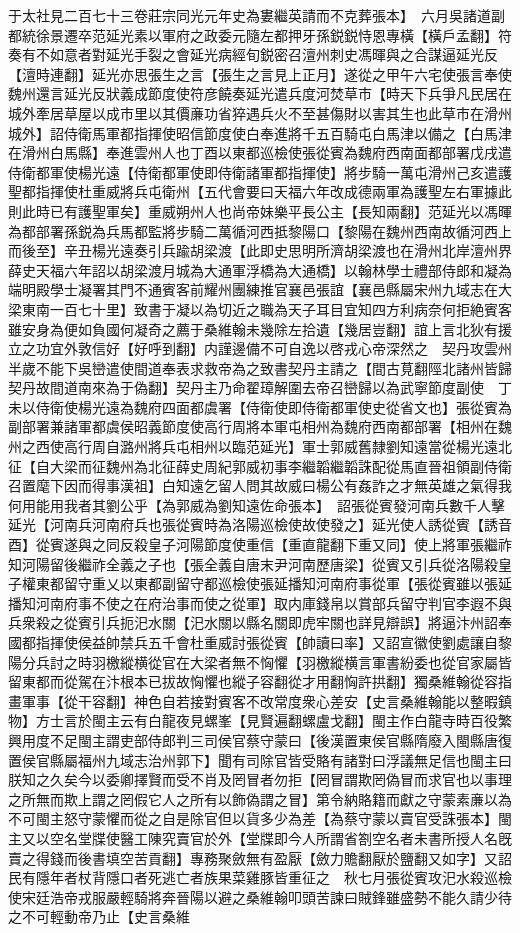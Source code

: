 于太社見二百七十三卷莊宗同光元年史為婁繼英請而不克葬張本】　六月吳諸道副都統徐景遷卒范延光素以軍府之政委元隨左都押牙孫鋭鋭恃恩專橫【橫戶孟翻】符奏有不如意者對延光手裂之會延光病經旬鋭密召澶州刺史馮暉與之合謀逼延光反【澶時連翻】延光亦思張生之言【張生之言見上正月】遂從之甲午六宅使張言奉使魏州還言延光反狀義成節度使符彦饒奏延光遣兵度河焚草市【時天下兵爭凡民居在城外牽居草屋以成市里以其價亷功省猝遇兵火不至甚傷財以害其生也此草市在滑州城外】詔侍衛馬軍都指揮使昭信節度使白奉進將千五百騎屯白馬津以備之【白馬津在滑州白馬縣】奉進雲州人也丁酉以東都巡檢使張從賓為魏府西南面都部署戊戌遣侍衛都軍使楊光遠【侍衛都軍使即侍衛諸軍都指揮使】將步騎一萬屯滑州己亥遣護聖都指揮使杜重威將兵屯衛州【五代會要曰天福六年改成德兩軍為護聖左右軍據此則此時已有護聖軍矣】重威朔州人也尚帝妹樂平長公主【長知兩翻】范延光以馮暉為都部署孫鋭為兵馬都監將步騎二萬循河西抵黎陽口【黎陽在魏州西南故循河西上而後至】辛丑楊光遠奏引兵踰胡梁渡【此即史思明所濟胡梁渡也在滑州北岸澶州界薛史天福六年詔以胡梁渡月城為大通軍浮橋為大通橋】以翰林學士禮部侍郎和凝為端明殿學士凝署其門不通賓客前耀州團練推官襄邑張誼【襄邑縣屬宋州九域志在大梁東南一百七十里】致書于凝以為切近之職為天子耳目宜知四方利病奈何拒絶賓客雖安身為便如負國何凝奇之薦于桑維翰未幾除左拾遺【幾居豈翻】誼上言北狄有援立之功宜外敦信好【好呼到翻】内謹邊備不可自逸以啓戎心帝深然之　契丹攻雲州半歲不能下吳巒遣使間道奉表求救帝為之致書契丹主請之【間古莧翻陘北諸州皆歸契丹故間道南來為于偽翻】契丹主乃命翟璋解圍去帝召巒歸以為武寧節度副使　丁未以侍衛使楊光遠為魏府四面都虞署【侍衛使即侍衛都軍使史從省文也】張從賓為副部署兼諸軍都虞侯昭義節度使高行周將本軍屯相州為魏府西南都部署【相州在魏州之西使高行周自潞州將兵屯相州以臨范延光】軍士郭威舊隸劉知遠當從楊光遠北征【自大梁而征魏州為北征薛史周紀郭威初事李繼韜繼韜誅配從馬直晉祖領副侍衛召置麾下因而得事漢祖】白知遠乞留人問其故威曰楊公有姦詐之才無英雄之氣得我何用能用我者其劉公乎【為郭威為劉知遠佐命張本】　詔張從賓發河南兵數千人擊延光【河南兵河南府兵也張從賓時為洛陽巡檢使故使發之】延光使人誘從賓【誘音酉】從賓遂與之同反殺皇子河陽節度使重信【重直龍翻下重又同】使上將軍張繼祚知河陽留後繼祚全義之子也【張全義自唐末尹河南歷唐梁】從賓又引兵從洛陽殺皇子權東都留守重乂以東都副留守都巡檢使張延播知河南府事從軍【張從賓雖以張延播知河南府事不使之在府治事而使之從軍】取内庫錢帛以賞部兵留守判官李遐不與兵衆殺之從賓引兵扼汜水關【汜水關以縣名關即虎牢關也詳見辯誤】將逼汴州詔奉國都指揮使侯益帥禁兵五千會杜重威討張從賓【帥讀曰率】又詔宣徽使劉處讓自黎陽分兵討之時羽檄縱横從官在大梁者無不恟懼【羽檄縱横言軍書紛委也從官家屬皆留東都而從駕在汴根本已拔故恟懼也縱子容翻從才用翻恟許拱翻】獨桑維翰從容指畫軍事【從干容翻】神色自若接對賓客不改常度衆心差安【史言桑維翰能以整暇鎮物】方士言於閩主云有白龍夜見螺峯【見賢遍翻螺盧戈翻】閩主作白龍寺時百役繁興用度不足閩主謂吏部侍郎判三司侯官蔡守蒙曰【後漢置東侯官縣隋廢入閩縣唐復置侯官縣屬福州九域志治州郭下】聞有司除官皆受賂有諸對曰浮議無足信也閩主曰朕知之久矣今以委卿擇賢而受不肖及罔冒者勿拒【罔冒謂欺罔偽冒而求官也以事理之所無而欺上謂之罔假它人之所有以飾偽謂之冒】第令納賂籍而獻之守蒙素亷以為不可閩主怒守蒙懼而從之自是除官但以貨多少為差【為蔡守蒙以賣官受誅張本】閩主又以空名堂牒使醫工陳究賣官於外【堂牒即今人所謂省劄空名者未書所授人名旣賣之得錢而後書填空苦貢翻】專務聚斂無有盈厭【斂力贍翻厭於鹽翻又如字】又詔民有隱年者杖背隱口者死逃亡者族果菜雞豚皆重征之　秋七月張從賓攻汜水殺巡檢使宋廷浩帝戎服嚴輕騎將奔晉陽以避之桑維翰叩頭苦諫曰賊鋒雖盛勢不能久請少待之不可輕動帝乃止【史言桑維